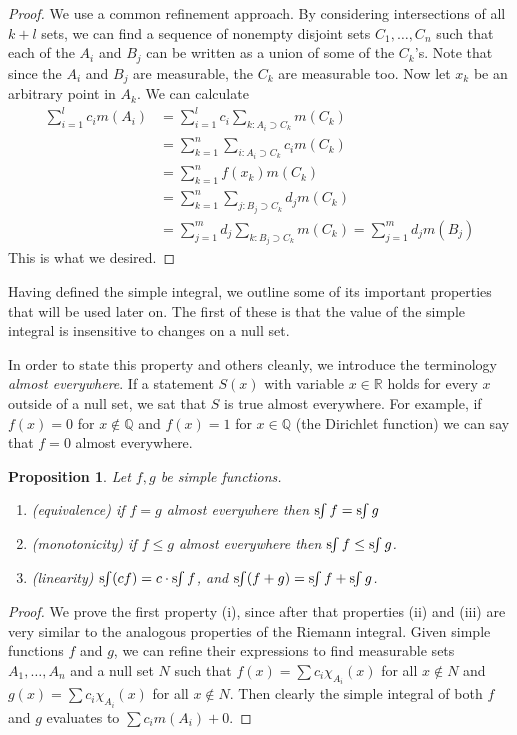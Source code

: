 \documentclass[10pt,oneside]{amsbook}
\newcommand{\QQ}{{\mathbb Q}}
\newcommand{\RR}{{\mathbb R}}
\newcommand{\sint}{\text{s}\kern-3pt\int}
\theoremstyle{definition}
\theoremstyle{plain}
\newtheorem{prop}[thm]{Proposition}
\theoremstyle{definition}
\theoremstyle{remark}
\numberwithin{equation}{section}
\numberwithin{figure}{section}
\begin{document}
\begin{proof}
  We use a common refinement approach. By considering intersections of all $k+l$ sets, we can find a sequence of nonempty disjoint sets $C_1,\ldots,C_n$ such that each of the $A_i$ and $B_j$ can be written as a union of some of the $C_k$'s. Note that since the $A_i$ and $B_j$ are measurable, the $C_k$ are measurable too. Now let $x_k$ be an arbitrary point in $A_k$. We can calculate
  \begin{align*}
    \sum_{i=1}^lc_im(A_i)
    &=\sum_{i=1}^lc_i\sum_{k:A_i\supset C_k}m(C_k)\\
    &=\sum_{k=1}^n\sum_{i:A_i\supset C_k}c_im(C_k)\\
    &=\sum_{k=1}^nf(x_k)m(C_k)\\
    &=\sum_{k=1}^n\sum_{j:B_j\supset C_k}d_jm(C_k)\\
    &=\sum_{j=1}^md_j\sum_{k:B_j\supset C_k}m(C_k)=\sum_{j=1}^md_jm(B_j)
  \end{align*}
  This is what we desired.
\end{proof}

Having defined the simple integral, we outline some of its important properties that will be used later on. The first of these is that the value of the simple integral is insensitive to changes on a null set.

In order to state this property and others cleanly, we introduce the terminology \emph{almost everywhere}. If a statement $S(x)$ with variable $x\in\RR$ holds for every $x$ outside of a null set, we sat that $S$ is true almost everywhere. For example, if $f(x)=0$ for $x\notin\QQ$ and $f(x)=1$ for $x\in\QQ$ (the Dirichlet function) we can say that $f=0$ almost everywhere.

\begin{prop}
  Let $f,g$ be simple functions.
  \begin{enumerate}
  \item (equivalence) if $f=g$ almost everywhere then $\sint f=\sint g$
  \item (monotonicity) if $f\leq g$ almost everywhere then $\sint f\leq\sint g$.
  \item (linearity) $\sint (cf)=c\cdot\sint f$, and $\sint (f+g)=\sint f+\sint g$.
  \end{enumerate}
\end{prop}

\begin{proof}
  We prove the first property (i), since after that properties (ii) and (iii) are very similar to the analogous properties of the Riemann integral. Given simple functions $f$ and $g$, we can refine their expressions to find measurable sets $A_1,\ldots,A_n$ and a null set $N$ such that $f(x)=\sum c_i\chi_{A_i}(x)$ for all $x\notin N$ and $g(x)=\sum c_i\chi_{A_i}(x)$ for all $x\notin N$. Then clearly the simple integral of both $f$ and $g$ evaluates to $\sum c_im(A_i)+0$.
\end{proof}
\end{document}
